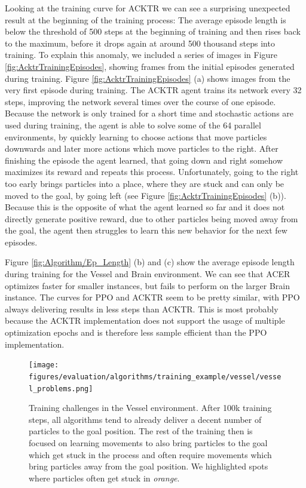 

Looking at the training curve for ACKTR we can see a surprising unexpected result at the beginning of the training process: The average episode length is below the threshold of 500 steps at the beginning of training and then rises back to the maximum, before it drops again at around 500 thousand steps into training. To explain this anomaly, we included a series of images in Figure \ref{fig:AcktrTrainingEpisodes}, showing frames from the initial episodes generated during training. Figure \ref{fig:AcktrTrainingEpisodes} (a) shows images from the very first episode during training. The ACKTR agent trains its network every 32 steps, improving the network several times over the course of one episode. Because the network is only trained for a short time and stochastic actions are used during training, the agent is able to solve some of the 64 parallel environments, by quickly learning to choose actions that move particles downwards and later more actions which move particles to the right. After finishing the episode the agent learned, that going down and right somehow maximizes its reward and repeats this process. Unfortunately, going to the right too early brings particles into a place, where they are stuck and can only be moved to the goal, by going left (see Figure \ref{fig:AcktrTrainingEpisodes} (b)). Because this is the opposite of what the agent learned so far and it does not directly generate positive reward, due to other particles being moved away from the goal, the agent then struggles to learn this new behavior for the next few episodes.

Figure \ref{fig:Algorithm/Ep_Length} (b) and (c) show the average episode length during training for the Vessel and Brain environment. We can see that ACER optimizes faster for smaller instances, but fails to perform on the larger Brain instance. The curves for PPO and ACKTR seem to be pretty similar, with PPO always delivering results in less steps than ACKTR. This is most probably because the ACKTR implementation does not support the usage of multiple optimization epochs and is therefore less sample efficient than the PPO implementation. 

\begin{figure} [htp]
    \begin{center}
        \texttt{[image: figures/evaluation/algorithms/training\_example/vessel/vessel\_problems.png]}
    \end{center}
    \caption[Training Challenges in the Vessel Environment]{Training challenges in the Vessel environment. After 100k training steps, all algorithms tend to already deliver a decent number of particles to the goal position. The rest of the training then is focused on learning movements to also bring particles to the goal which get stuck in the process and often require movements which bring particles away from the goal position. We highlighted spots where particles often get stuck in \textit{orange}.} \label{fig:Algorithm/Problems/Vessel}
\end{figure}


